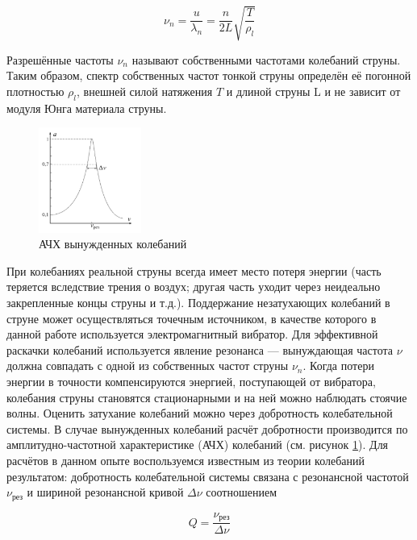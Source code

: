 \documentclass[a4paper,12pt]{article} %
\begin{document}
\begin{equation}
    \nu_n = \frac{u}{\lambda_n} = \frac{n}{2L}\sqrt{\frac{T}{\rho_l}}
    \label{ownFrequency}
\end{equation}

Разрешённые частоты $ \nu_n $ называют собственными частотами колебаний струны. Таким образом, спектр собственных частот тонкой струны определён её погонной плотностью $ \rho_l $, внешней силой натяжения $ T $ и длиной
струны L и не зависит от модуля Юнга материала струны. 

\begin{figure}
    \centering
    \includegraphics[width = 0.3\textwidth]{1.4.5 AFC.PNG}
    \caption{АЧХ вынужденных колебаний}
    \label{fig:AFC}
\end{figure}

При колебаниях реальной струны всегда имеет место потеря энергии
(часть теряется вследствие трения о воздух; другая часть уходит через неидеально закрепленные концы струны и т.д.). Поддержание незатухающих
колебаний в струне может осуществляться точечным источником, в качестве которого в данной работе используется электромагнитный вибратор.
Для эффективной раскачки колебаний используется явление резонанса
— вынуждающая частота $ \nu $ должна совпадать с одной из собственных частот струны $ \nu_n $. Когда потери энергии в точности компенсируются энергией, поступающей от вибратора, колебания струны становятся стационарными и на ней можно наблюдать стоячие волны. 
Оценить затухание колебаний можно через добротность колебательной системы. В случае вынужденных колебаний расчёт добротности производится по амплитудно-частотной характеристике (АЧХ) колебаний (см. рисунок \ref{fig:AFC}). Для расчётов в данном опыте воспользуемся известным из теории колебаний результатом: добротность колебательной системы связана с резонансной частотой $ \nu_\text{рез} $ и шириной резонансной кривой $ \Delta \nu $ соотношением 

\begin{equation}
    Q = \frac{\nu_\text{рез}}{\Delta \nu}
\end{equation}
\end{document}
